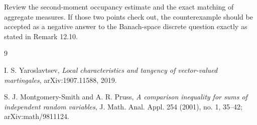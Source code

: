\documentclass[11pt]{article}
\begin{document}
Review the second-moment occupancy estimate and the exact matching of aggregate
measures.  If those two points check out, the counterexample should be accepted
as a negative answer to the Banach-space discrete question exactly as stated in
Remark 12.10.

\begin{thebibliography}{9}

I. S. Yaroslavtsev,
\emph{Local characteristics and tangency of vector-valued martingales},
arXiv:1907.11588, 2019.

S. J. Montgomery-Smith and A. R. Pruss,
\emph{A comparison inequality for sums of independent random variables},
J. Math. Anal. Appl. 254 (2001), no. 1, 35--42;
arXiv:math/9811124.

\end{thebibliography}
\end{document}
